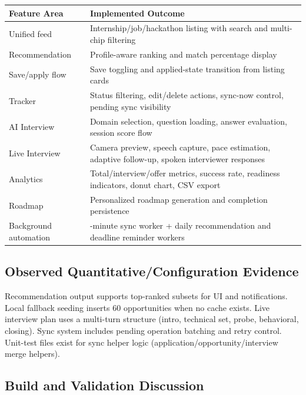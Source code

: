 \documentclass[conference]{IEEEtran}
\begin{document}
\begin{table}[!tb]
\centering
\setlength{\tabcolsep}{4pt}
\normalsize
\begin{tabularx}{\textwidth}{|>{\RaggedRight\arraybackslash}X|>{\RaggedRight\arraybackslash}X|}
\hline
 \textbf{Feature Area} & \textbf{Implemented Outcome} \\
\hline
 Unified feed & Internship/job/hackathon listing with search and multi-chip filtering \\
\hline
 Recommendation & Profile-aware ranking and match percentage display \\
\hline
 Save/apply flow & Save toggling and applied-state transition from listing cards \\
\hline
 Tracker & Status filtering, edit/delete actions, sync-now control, pending sync visibility \\
\hline
 AI Interview & Domain selection, question loading, answer evaluation, session score flow \\
\hline
 Live Interview & Camera preview, speech capture, pace estimation, adaptive follow-up, spoken interviewer responses \\
\hline
 Analytics & Total/interview/offer metrics, success rate, readiness indicators, donut chart, CSV export \\
\hline
 Roadmap & Personalized roadmap generation and completion persistence \\
\hline
 Background automation & 15-minute sync worker + daily recommendation and deadline reminder workers \\
\hline
\end{tabularx}
\end{table}

\subsection{Observed Quantitative/Configuration Evidence}

Recommendation output supports top-ranked subsets for UI and notifications. Local fallback seeding inserts 60 opportunities when no cache exists. Live interview plan uses a multi-turn structure (intro, technical set, probe, behavioral, closing). Sync system includes pending operation batching and retry control. Unit-test files exist for sync helper logic (application/opportunity/interview merge helpers).

\subsection{Build and Validation Discussion}
\end{document}
